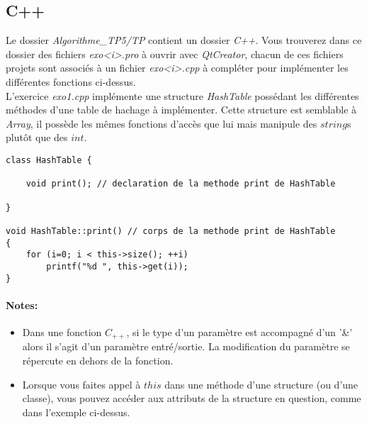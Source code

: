 \documentclass[11pt]{extarticle}
\begin{document}
\subsection{C++}
Le dossier \textit{Algorithme\_TP5/TP} contient un dossier \textit{C++}. Vous trouverez dans ce dossier des fichiers \textit{exo<i>.pro} à ouvrir avec \textit{QtCreator}, chacun de ces fichiers projets sont associés à un fichier \textit{exo<i>.cpp} à compléter pour implémenter les différentes fonctions ci-dessus. \\
L'exercice \textit{exo1.cpp} implémente une structure \textit{HashTable} possédant les différentes méthodes d'une table de hachage à implémenter. Cette structure est semblable à \textit{Array}, il possède les mêmes fonctions d'accès que lui mais manipule des $string$s plutôt que des $int$.
\begin{lstlisting}[style=customc, escapechar=@]
class HashTable {

	void print(); // declaration de la methode print de HashTable

}

void HashTable::print() // corps de la methode print de HashTable
{
	for (i=0; i < this->size(); ++i)
		printf("%d ", this->get(i));
}
\end{lstlisting}
\paragraph{Notes:} 
\begin{itemize}
\item Dans une fonction $C_{++}$, si le type d'un paramètre est accompagné d'un '\&' alors il s'agit d'un paramètre entré/sortie. La modification du paramètre se répercute en dehors de la fonction.
\item Lorsque vous faites appel à $this$ dans une méthode d'une structure (ou d'une classe), vous pouvez accéder aux attributs de la structure en question, comme dans l'exemple ci-dessus.
\end{itemize}
\end{document}
